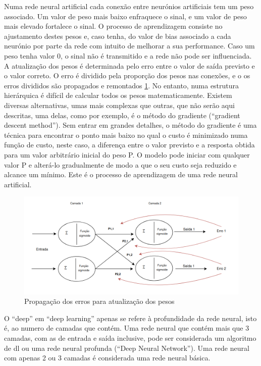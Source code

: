 Numa rede neural artificial cada conexão entre neurónios artificiais tem um peso associado. Um valor de peso mais baixo enfraquece o sinal, e um valor de peso mais elevado fortalece o sinal. O processo de aprendizagem consiste no ajustamento destes pesos e, caso tenha, do valor de bias associado a cada neurónio por parte da rede com intuito de melhorar a sua performance. Caso um peso tenha valor 0, o sinal não é transmitido e a rede não pode ser influenciada. A atualização dos pesos é determinada pelo erro entre o valor de saída previsto e o valor correto. O erro é dividido pela proporção dos pesos nas conexões, e o os erros divididos são propagados e remontados \ref{propagaçao}. No entanto, numa estrutura hierárquica é difícil de calcular todos os pesos matematicamente. Existem diversas alternativas, umas mais complexas que outras, que não serão aqui descritas, uma delas, como por exemplo, é o método do gradiente (``gradient descent method''). Sem entrar em grandes detalhes, o método do gradiente é uma técnica para encontrar o ponto mais baixo no qual o custo é minimizado numa função de custo, neste caso, a diferença entre o valor previsto e a resposta obtida para um valor arbitrário inicial do peso P. O modelo pode iniciar com qualquer valor P e alterá-lo gradualmente de modo a que o seu custo seja reduzido e alcance um mínimo. Este é o processo de aprendizagem de uma rede neural artificial.


\begin{figure}[H]
\centering
\includegraphics[scale=0.42]{figs/propagação}
\caption{Propagação dos erros para atualização dos pesos}\label{propagaçao}
\end{figure}




O ``deep'' em ``deep learning'' apenas se refere à profundidade da rede neural, isto é, ao numero de camadas que contém. Uma rede neural que contém mais que 3 camadas, com as de entrada e saída inclusive, pode ser considerada um algoritmo de \ac{dl} ou uma rede neural profunda (``Deep Neural Network''). Uma rede neural com apenas 2 ou 3 camadas é considerada uma rede neural básica.